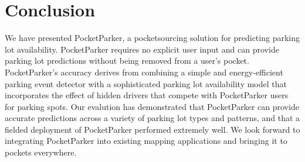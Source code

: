 \section{Conclusion}
\label{sec-conclusions}

We have presented PocketParker, a pocketsourcing solution for predicting
parking lot availability. PocketParker requires no explicit user input and
can provide parking lot predictions without being removed from a user's
pocket. PocketParker's accuracy derives from combining a simple and
energy-efficient parking event detector with a sophisticated parking lot
availability model that incorporates the effect of hidden drivers that
compete with PocketParker users for parking spots. Our evalution has
demonstrated that PocketParker can provide accurate predictions across a
variety of parking lot types and patterns, and that a fielded deployment of
PocketParker performed extremely well. We look forward to integrating
PocketParker into existing mapping applications and bringing it to pockets
everywhere.
